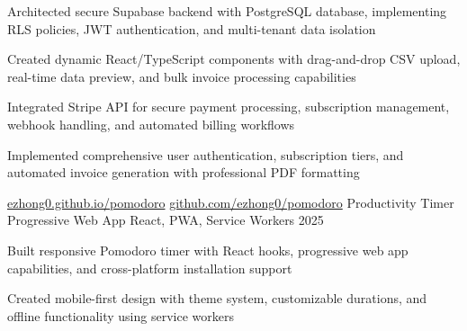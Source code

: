 \documentclass[12pt, letterpaper]{russell}
\begin{document}
\begin{cventries}
{\begin{cvitems}
        \item {Architected secure Supabase backend with PostgreSQL database, implementing RLS policies, JWT authentication, and multi-tenant data isolation}
        \item {Created dynamic React/TypeScript components with drag-and-drop CSV upload, real-time data preview, and bulk invoice processing capabilities}
        \item {Integrated Stripe API for secure payment processing, subscription management, webhook handling, and automated billing workflows}
        \item {Implemented comprehensive user authentication, subscription tiers, and automated invoice generation with professional PDF formatting}
      \end{cvitems}
    }
    \cvprojectinline
    {\href{https://ezhong0.github.io/pomodoro/}{ezhong0.github.io/pomodoro} \textbar{} \href{https://github.com/ezhong0/pomodoro}{github.com/ezhong0/pomodoro}} %
    {Productivity Timer Progressive Web App} %
    {React, PWA, Service Workers} %
    {2025} %
    {
      \begin{cvitems}
        \item {Built responsive Pomodoro timer with React hooks, progressive web app capabilities, and cross-platform installation support}
        \item {Created mobile-first design with theme system, customizable durations, and offline functionality using service workers}
      \end{cvitems}
    }
\end{cventries}
\vspace{-0.15cm}


\vspace{-0.45cm}
\end{document}
